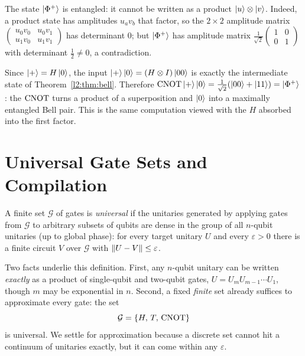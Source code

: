 The state $\ket{\Phi^{+}}$ is entangled: it cannot be written as a product
$\ket{u}\otimes\ket{v}$. Indeed, a product state has amplitudes $u_{a}v_{b}$ that
factor, so the $2\times2$ amplitude matrix
$\left(\begin{smallmatrix}u_{0}v_{0}&u_{0}v_{1}\\u_{1}v_{0}&u_{1}v_{1}\end{smallmatrix}\right)$
has determinant $0$; but $\ket{\Phi^{+}}$ has amplitude matrix
$\tfrac{1}{\sqrt2}\left(\begin{smallmatrix}1&0\\0&1\end{smallmatrix}\right)$ with
determinant $\tfrac12\neq0$, a contradiction.

\begin{example}
Since $\ket{+}=H\ket{0}$, the input $\ket{+}\ket{0}=(H\otimes I)\ket{00}$ is
exactly the intermediate state of Theorem~\ref{l2:thm:bell}. Therefore
$\mathrm{CNOT}\ket{+}\ket{0}=\tfrac{1}{\sqrt2}(\ket{00}+\ket{11})=\ket{\Phi^{+}}$: the
$\mathrm{CNOT}$ turns a product of a superposition and $\ket{0}$ into a maximally
entangled Bell pair. This is the same computation viewed with the $H$ absorbed
into the first factor.
\end{example}

\section{Universal Gate Sets and Compilation}

\begin{definition}
A finite set $\mathcal{G}$ of gates is \emph{universal} if the unitaries
generated by applying gates from $\mathcal{G}$ to arbitrary subsets of qubits are
dense in the group of all $n$-qubit unitaries (up to global phase): for every
target unitary $U$ and every $\varepsilon>0$ there is a finite circuit $V$ over
$\mathcal{G}$ with $\lVert U-V\rVert\le\varepsilon$.
\end{definition}

Two facts underlie this definition. First, any $n$-qubit unitary can be written
\emph{exactly} as a product of single-qubit and two-qubit gates,
$U=U_{m}U_{m-1}\cdots U_{1}$, though $m$ may be exponential in $n$. Second, a
fixed \emph{finite} set already suffices to approximate every gate: the set
\[
  \mathcal{G}=\{H,\,T,\,\mathrm{CNOT}\}
\]
is universal. We settle for approximation because a discrete set cannot hit a
continuum of unitaries exactly, but it can come within any $\varepsilon$.

